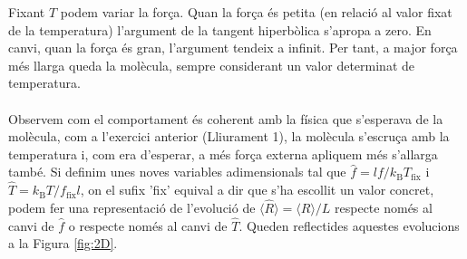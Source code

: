 \documentclass[12pt,twosides,onecolumn,openany]{article}
\begin{document}
Fixant $T$ podem variar la força. Quan la força és petita (en relació al valor fixat de la temperatura) l'argument de la tangent hiperbòlica s'apropa a zero. En canvi, quan la força és gran, l'argument tendeix a infinit. Per tant, a major força més llarga queda la molècula, sempre considerant un valor determinat de temperatura.\\\\
Observem com el comportament és coherent amb la física que s'esperava de la molècula, com a l'exercici anterior (Lliurament 1), la molècula s'escruça amb la temperatura i, com era d'esperar, a més força externa apliquem més s'allarga també. Si definim unes noves variables adimensionals tal que $\hat{f}=lf/k_{\text{B}}T_{\text{fix}}$ i $\hat{T} = k_{\text{B}}T/f_{\text{fix}}l$, on el sufix 'fix' equival a dir que s'ha escollit un valor concret, podem fer una representació de l'evolució de $\langle \hat{R} \rangle = \langle R \rangle /L$ respecte només al canvi de $\hat{f}$ o respecte només al canvi de $\hat{T}$. Queden reflectides aquestes evolucions a la Figura \ref{fig:2D}.
\end{document}
